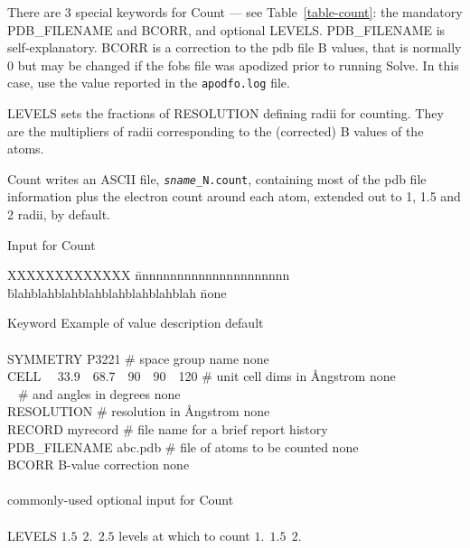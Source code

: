 \documentclass{report}
\begin{document}
{There are 3 special keywords for Count --- see Table~\ref{table-count}:
the mandatory PDB\_FILENAME and BCORR, and optional LEVELS.  
PDB\_FILENAME is self-explanatory.
BCORR is a correction to the pdb file B values, that is normally 0
but may be changed if the fobs file was apodized prior to running Solve.
In this case, use the value reported in the {\tt apodfo.log} file.

LEVELS sets the fractions of RESOLUTION defining radii for counting.
They  are the multipliers of radii corresponding to the (corrected) B values
of the atoms.  

Count writes an ASCII file, {\tt {\it sname}\_N.count}, containing most of the 
pdb file
information plus the electron count around each atom, extended out to 
1, 1.5 and 2 radii, by default.

\begin{table}[hbt]
\caption {\large Input for Count}
\label{table-count}

\begin{tabbing}
XXXXXXXXXXXXX \= nnnnnnnnnnnnnnnnnnnnnn \= 
blahblahblahblahblahblahblahblah \= none \kill

Keyword \> Example of value \> description \> default \\
\\ 
SYMMETRY \> P3221 \> \# space group name \>  none \\
CELL ~~33.9~~68.7~~90~~90~~120 \> \# unit cell dims in \AA ngstrom \> none \\
\ \> \> \# and angles in degrees \> none \\
RESOLUTION  \> \# resolution in \AA ngstrom \> none \\
RECORD \> myrecord \> \# file name for a brief report \> history \\
PDB\_FILENAME \> abc.pdb \> \# file of atoms to be counted  \> none \\
BCORR    \> B-value correction \> none  \\
\\
\> commonly-used optional input for Count  \> \\
\\
LEVELS \> $1.5~~2.~~2.5$   levels at which to count \> $1.~~1.5~~2.$ \\
\\

\end{tabbing} 
\end{table}


}
\end{document}
